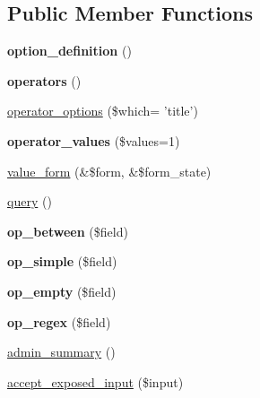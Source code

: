 \subsection*{Public Member Functions}
\begin{DoxyCompactItemize}
\item 
\hypertarget{classviews__handler__filter__numeric_aa6c2de73a4c7eda8575e1691b8218b3b}{
{\bfseries option\_\-definition} ()}
\label{classviews__handler__filter__numeric_aa6c2de73a4c7eda8575e1691b8218b3b}

\item 
\hypertarget{classviews__handler__filter__numeric_adcdd72328ca5fa645ac82b30e8eaad54}{
{\bfseries operators} ()}
\label{classviews__handler__filter__numeric_adcdd72328ca5fa645ac82b30e8eaad54}

\item 
\hyperlink{classviews__handler__filter__numeric_a55335fe026be2bd630638382050626e6}{operator\_\-options} (\$which= 'title')
\item 
\hypertarget{classviews__handler__filter__numeric_a13018d564ca15254822b6381eaddff71}{
{\bfseries operator\_\-values} (\$values=1)}
\label{classviews__handler__filter__numeric_a13018d564ca15254822b6381eaddff71}

\item 
\hyperlink{classviews__handler__filter__numeric_ab0888218590f7c620f10fc04a98d135e}{value\_\-form} (\&\$form, \&\$form\_\-state)
\item 
\hyperlink{classviews__handler__filter__numeric_aaa5c6b227651bd1676850f5999f2a897}{query} ()
\item 
\hypertarget{classviews__handler__filter__numeric_a65445ba78ee73a2e64311af7888fb850}{
{\bfseries op\_\-between} (\$field)}
\label{classviews__handler__filter__numeric_a65445ba78ee73a2e64311af7888fb850}

\item 
\hypertarget{classviews__handler__filter__numeric_aca9524bdd6d534b8c4fcbcf019662641}{
{\bfseries op\_\-simple} (\$field)}
\label{classviews__handler__filter__numeric_aca9524bdd6d534b8c4fcbcf019662641}

\item 
\hypertarget{classviews__handler__filter__numeric_a12e3f374a810ce5dbb586ec0bcb83e0d}{
{\bfseries op\_\-empty} (\$field)}
\label{classviews__handler__filter__numeric_a12e3f374a810ce5dbb586ec0bcb83e0d}

\item 
\hypertarget{classviews__handler__filter__numeric_a09c8b0bde5c9b5955bb56b278c9268a5}{
{\bfseries op\_\-regex} (\$field)}
\label{classviews__handler__filter__numeric_a09c8b0bde5c9b5955bb56b278c9268a5}

\item 
\hyperlink{classviews__handler__filter__numeric_aaece85d3c36d4186c871cc55e636f4f2}{admin\_\-summary} ()
\item 
\hyperlink{classviews__handler__filter__numeric_a0fd6abb3062be32410bef3c1cefdaaf5}{accept\_\-exposed\_\-input} (\$input)
\end{DoxyCompactItemize}
